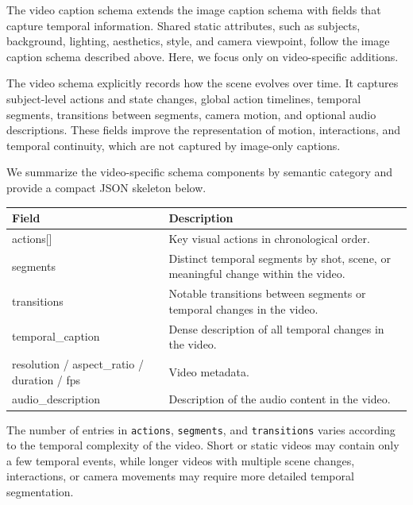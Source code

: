 \documentclass{llmxive}
\providecommand{\arraystretch}{1.5}
\begin{document}
The video caption schema extends the image caption schema with fields that capture temporal information. Shared static attributes, such as subjects, background, lighting, aesthetics, style, and camera viewpoint, follow the image caption schema described above. Here, we focus only on video-specific additions.

The video schema explicitly records how the scene evolves over time. It captures subject-level actions and state changes, global action timelines, temporal segments, transitions between segments, camera motion, and optional audio descriptions. These fields improve the representation of motion, interactions, and temporal continuity, which are not captured by image-only captions.

We summarize the video-specific schema components by semantic category and provide a compact JSON skeleton below.

\begin{tcolorbox}[
    colback=black!2,
    colframe=nvidiagreen!75!white,
    boxrule=0.4pt,
    arc=1pt,
    left=4pt,
    right=4pt,
    top=4pt,
    bottom=4pt,
    title=Additional Top-level Fields in the Video Caption Schema
]
\small
\renewcommand{\arraystretch}{1.1}
\begin{tabularx}{\linewidth}{@{}>{\ttfamily}lX@{}}
\toprule
Field & Description \\
\midrule
actions[] & Key visual actions in chronological order. \\
segments & Distinct temporal segments by shot, scene, or meaningful change within the video. \\
transitions & Notable transitions between segments or temporal changes in the video. \\
temporal\_caption & Dense description of all temporal changes in the video. \\
resolution / aspect\_ratio / duration / fps & Video metadata. \\
audio\_description & Description of the audio content in the video. \\
\bottomrule
\end{tabularx}
\end{tcolorbox}


The number of entries in \texttt{actions}, \texttt{segments}, and \texttt{transitions} varies according to the temporal complexity of the video. Short or static videos may contain only a few temporal events, while longer videos with multiple scene changes, interactions, or camera movements may require more detailed temporal segmentation.
\end{document}

